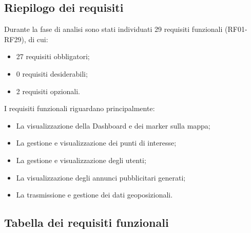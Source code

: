 \documentclass[10pt]{article}
\begin{document}
\subsection{Riepilogo dei requisiti}
Durante la fase di analisi sono stati individuati 29 requisiti funzionali (RF01-RF29), di cui:
\begin{itemize}
    \item 27 requisiti obbligatori;
    \item 0 requisiti desiderabili;
    \item 2 requisiti opzionali.
\end{itemize}

I requisiti funzionali riguardano principalmente:
\begin{itemize}
    \item La visualizzazione della Dashboard e dei marker sulla mappa;
    \item La gestione e visualizzazione dei punti di interesse;
    \item La gestione e visualizzazione degli utenti;
    \item La visualizzazione degli annunci pubblicitari generati;
    \item La trasmissione e gestione dei dati geoposizionali.
\end{itemize}

\subsection{Tabella dei requisiti funzionali}
\end{document}
